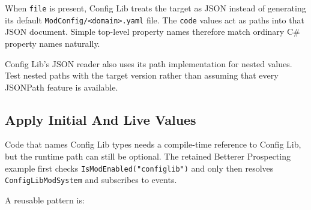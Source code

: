 \documentclass[
  11pt,
  letterpaper,
  titlepage]{article}
\begin{document}
When \texttt{file} is present, Config Lib treats the target as JSON
instead of generating its default
\texttt{ModConfig/\textless{}domain\textgreater{}.yaml} file. The
\texttt{code} values act as paths into that JSON document. Simple
top-level property names therefore match ordinary C\# property names
naturally.

Config Lib's JSON reader also uses its path implementation for nested
values. Test nested paths with the target version rather than assuming
that every JSONPath feature is available.

\subsection{Apply Initial And Live
Values}\label{apply-initial-and-live-values}

Code that names Config Lib types needs a compile-time reference to
Config Lib, but the runtime path can still be optional. The retained
Betterer Prospecting example first checks
\texttt{IsModEnabled("configlib")} and only then resolves
\texttt{ConfigLibModSystem} and subscribes to events.

A reusable pattern is:
\end{document}
